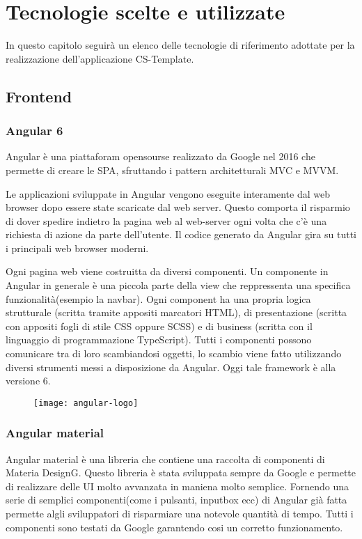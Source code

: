 
\chapter{Tecnologie scelte e utilizzate}
\label{cap:Tecnologie scelte e utilizzate}
In questo capitolo seguirà un elenco delle tecnologie di riferimento adottate per la realizzazione dell'applicazione CS-Template.
\section{Frontend}
\subsection{Angular 6}
Angular è una piattaforam opensourse realizzato da Google nel 2016 che permette di creare le SPA, sfruttando i
pattern architetturali MVC e MVVM.

Le applicazioni sviluppate in Angular vengono eseguite interamente dal web browser dopo essere state scaricate dal web server. Questo comporta il risparmio di dover spedire indietro la pagina web al web-server ogni volta che c'è una richiesta di azione da parte dell'utente. Il codice generato da Angular gira su tutti i principali web browser moderni.

Ogni pagina web viene costruitta da diversi componenti. Un componente in Angular in generale è una piccola parte della view che reppressenta una specifica funzionalità(esempio la navbar).   Ogni component ha una propria logica
strutturale (scritta tramite appositi marcatori HTML), di presentazione (scritta con
appositi fogli di stile CSS oppure SCSS) e di business (scritta con il linguaggio di programmazione
TypeScript). Tutti i componenti possono comunicare tra di loro scambiandosi
oggetti, lo scambio viene fatto utilizzando diversi strumenti messi a disposizione da Angular. Oggi tale framework è alla versione 6.
\begin{figure}[!h] 
	\centering 
	\texttt{[image: angular-logo]} 
\end{figure}

\subsection{Angular material}
Angular material è una libreria che contiene una raccolta di componenti di Materia DesignG. Questo libreria è stata sviluppata sempre da Google e permette di realizzare delle UI molto avvanzata in maniena molto semplice. Fornendo una serie di semplici componenti(come i pulsanti, inputbox ecc) di Angular già fatta permette algli sviluppatori di risparmiare una notevole quantità di tempo. Tutti i componenti sono testati da Google garantendo cosi un corretto funzionamento.


